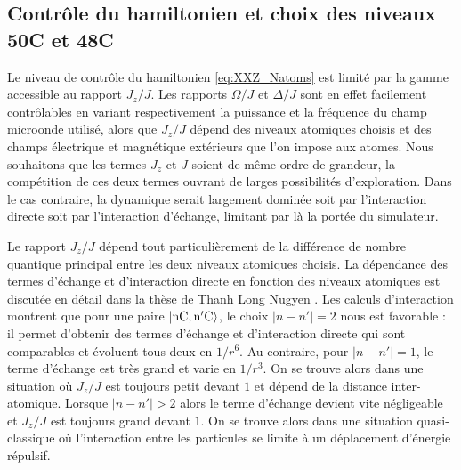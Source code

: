 	\subsection*{Contrôle du hamiltonien et choix des niveaux 50C et 48C}
\noindent Le niveau de contrôle du hamiltonien \eqref{eq:XXZ_Natoms} est limité par la gamme accessible au rapport $J_z/J$.
Les rapports $\Omega/J$ et $\Delta/J$ sont en effet facilement contrôlables en variant respectivement la puissance et la fréquence du champ microonde utilisé, alors que $J_z/J$ dépend des niveaux atomiques choisis et des champs électrique et magnétique extérieurs que l'on impose aux atomes.
Nous souhaitons que les termes $J_z$ et $J$ soient de même ordre de grandeur, la compétition de ces deux termes ouvrant de larges possibilités d'exploration.
Dans le cas contraire, la dynamique serait largement dominée soit par l'interaction directe soit par l'interaction d'échange, limitant par là la portée du simulateur.

Le rapport $J_z/J$ dépend tout particulièrement de la différence de nombre quantique principal entre les deux niveaux atomiques choisis.
La dépendance des termes d'échange et d'interaction directe en fonction des niveaux atomiques est discutée en détail dans la thèse de Thanh Long Nugyen \cite{PHD_NGUYEN}.
Les calculs d'interaction montrent que pour une paire $\ket{\mathrm{nC},\mathrm{n'C}}$, 
le choix $|n-n'|=2$ nous est favorable : il permet d'obtenir des termes d'échange et d'interaction directe qui sont comparables et évoluent tous deux en $1/r^6$.
Au contraire, pour $|n-n'|=1$, le terme d'échange est très grand et varie en $1/r^3$.
On se trouve alors dans une situation où $J_z/J$ est toujours petit devant $1$ et dépend de la distance inter-atomique.
Lorsque $|n-n'|>2$ alors le terme d'échange devient vite négligeable et $J_z/J$ est toujours grand devant $1$.
On se trouve alors dans une situation quasi-classique où l'interaction entre les particules se limite à un déplacement d'énergie répulsif.

